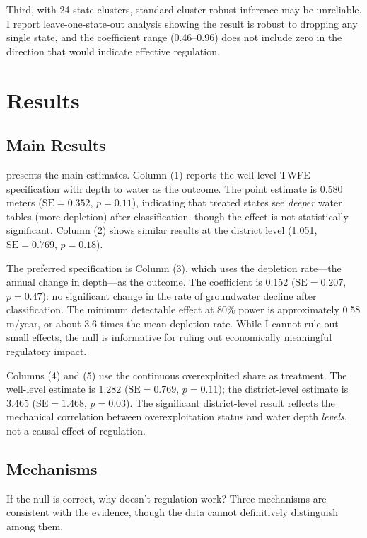 \documentclass[12pt]{article}
\begin{document}
Third, with 24 state clusters, standard cluster-robust inference may be unreliable. I report leave-one-state-out analysis showing the result is robust to dropping any single state, and the coefficient range (0.46--0.96) does not include zero in the direction that would indicate effective regulation.

\section{Results}

\subsection{Main Results}

 presents the main estimates. Column (1) reports the well-level TWFE specification with depth to water as the outcome. The point estimate is 0.580 meters ($\text{SE} = 0.352$, $p = 0.11$), indicating that treated states see \textit{deeper} water tables (more depletion) after classification, though the effect is not statistically significant. Column (2) shows similar results at the district level (1.051, $\text{SE} = 0.769$, $p = 0.18$).

The preferred specification is Column (3), which uses the depletion rate---the annual change in depth---as the outcome. The coefficient is 0.152 ($\text{SE} = 0.207$, $p = 0.47$): no significant change in the rate of groundwater decline after classification. The minimum detectable effect at 80\% power is approximately 0.58 m/year, or about 3.6 times the mean depletion rate. While I cannot rule out small effects, the null is informative for ruling out economically meaningful regulatory impact.

Columns (4) and (5) use the continuous overexploited share as treatment. The well-level estimate is 1.282 ($\text{SE} = 0.769$, $p = 0.11$); the district-level estimate is 3.465 ($\text{SE} = 1.468$, $p = 0.03$). The significant district-level result reflects the mechanical correlation between overexploitation status and water depth \textit{levels}, not a causal effect of regulation.



\subsection{Mechanisms}

If the null is correct, why doesn't regulation work? Three mechanisms are consistent with the evidence, though the data cannot definitively distinguish among them.
\end{document}
